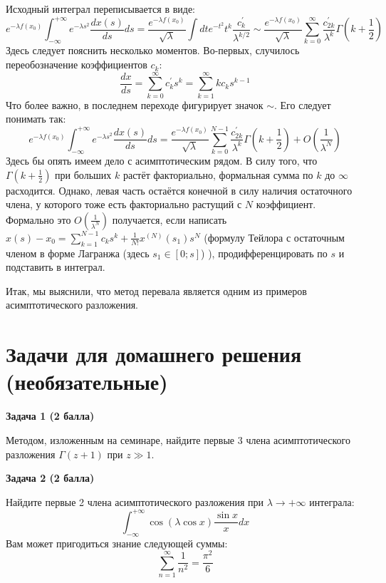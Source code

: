 \documentclass[a4paper,12pt]{article}
\begin{document}
\noindent
Исходный интеграл переписывается в виде:
$$
e^{-\lambda f(x_0)}\int_{-\infty}^{+\infty}e^{-\lambda s^2}\frac{dx(s)}{ds}ds=\frac{e^{-\lambda f(x_0)}}{\sqrt{\lambda}}\int dt e^{-t^2}t^k \frac{c^{'}_k}{\lambda^{k/2}}\sim\frac{e^{-\lambda f(x_0)}}{\sqrt{\lambda}}\sum_{k=0}^{\infty}\frac{c_{2k}^{'}}{\lambda^{k}}\Gamma\left(k+\frac{1}{2}\right)
$$
Здесь следует пояснить несколько моментов. Во-первых, случилось переобозначение коэффициентов $c_k$:
$$
\frac{dx}{ds}=\sum_{k=0}^{\infty}c_k^{'}s^k=\sum_{k=1}^{\infty}kc_{k}s^{k-1}
$$
Что более важно, в последнем переходе фигурирует значок $\sim$. Его следует понимать так:
$$
e^{-\lambda f(x_0)}\int_{-\infty}^{+\infty}e^{-\lambda s^2}\frac{dx(s)}{ds}ds=\frac{e^{-\lambda f(x_0)}}{\sqrt{\lambda}}\sum_{k=0}^{N-1}\frac{c_{2k}^{'}}{\lambda^{k}}\Gamma\left(k+\frac{1}{2}\right)+O\left(\frac{1}{\lambda^{N}}\right)
$$
Здесь бы опять имеем дело с асимптотическим рядом. В силу того, что $\Gamma\left(k+\frac{1}{2}\right)$ при больших $k$ растёт факториально, формальная сумма по $k$ до $\infty$ расходится. Однако, левая часть остаётся конечной в силу наличия остаточного члена, у которого тоже есть факториально растущий с $N$ коэффициент. Формально это $O\left(\frac{1}{\lambda^{N}}\right)$ получается, если написать $x(s)-x_0=\sum_{k=1}^{N-1}c_k s^k+\frac{1}{N!}x^{(N)}(s_1)s^{N}$ (формулу Тейлора с остаточным членом в форме Лагранжа (здесь $s_1\in[0;s]$) ), продифференцировать по $s$ и подставить в интеграл.

\noindent
Итак, мы выяснили, что метод перевала является одним из примеров асимптотического разложения.
\section*{Задачи для домашнего решения (необязательные)}

\noindent \textbf {Задача 1 (2 балла)} 

\noindent Методом, изложенным на семинаре, найдите первые 3 члена асимптотического разложения $\Gamma(z+1)$ при $z\gg1$.

\noindent \textbf {Задача 2 (2 балла)}

\noindent Найдите первые 2 члена асимптотического разложения при $\lambda\to+\infty$ интеграла:
$$
\int_{-\infty}^{+\infty}\cos\left(\lambda\cos x\right)\frac{\sin x}{x}dx
$$ 
Вам может пригодиться знание следующей суммы:
$$
\sum_{n=1}^{\infty}\frac{1}{n^2}=\frac{\pi^2}{6}
$$
\end{document}

